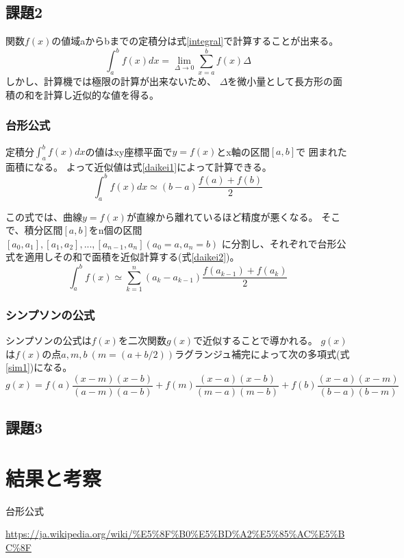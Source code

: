 \documentclass[dvipdfmx]{jsarticle}
\begin{document}
\subsection{課題2}

関数$f(x)$の値域aからbまでの定積分は式\ref{integral}で計算することが出来る。
\begin{equation}
  \int_a^b f(x) dx = \lim_{\Delta \to 0} \sum_{x=a}^{b} f(x) \Delta
  \label{integral}
\end{equation}
しかし、計算機では極限の計算が出来ないため、
$\Delta$を微小量として長方形の面積の和を計算し近似的な値を得る。

\subsubsection{台形公式}
定積分$\int_a^b f(x)dx$の値はxy座標平面で$y=f(x)$とx軸の区間$[a,b]$で
囲まれた面積になる。
よって近似値は式\ref{daikei1}によって計算できる。
\begin{equation}
  \int_a^b f(x)dx \simeq (b-a)\frac{f(a)+f(b)}{2}
  \label{daikei1}
\end{equation}

この式では、曲線$y=f(x)$が直線から離れているほど精度が悪くなる。
そこで、積分区間$[a,b]$をn個の区間$[a_0,a_1],[a_1,a_2],...,[a_{n-1},a_n] (a_0=a,a_n=b)$
に分割し、それぞれで台形公式を適用しその和で面積を近似計算する(式\ref{daikei2})。
\begin{equation}
  \int_a^b f(x) \simeq \sum_{k=1}^{n} (a_k-a_{k-1})\frac{f(a_{k-1})+f(a_k)}{2}
  \label{daikei2}
\end{equation}

\subsubsection{シンプソンの公式}
シンプソンの公式は$f(x)$を二次関数$g(x)$で近似することで導かれる。
$g(x)$は$f(x)$の点$a,m,b~(m=(a+b/2))$ラグランジュ補完によって次の多項式(式\ref{sim1})になる。
\begin{equation}
  g(x) = f(a)\frac{(x-m)(x-b)}{(a-m)(a-b)}+f(m)\frac{(x-a)(x-b)}{(m-a)(m-b)}+f(b)\frac{(x-a)(x-m)}{(b-a)(b-m)}
  \label{sim1}
\end{equation}



\subsection{課題3}

\section{結果と考察}

\begin{thebibliography}{10}
   台形公式

  \url{https://ja.wikipedia.org/wiki/%E5%8F%B0%E5%BD%A2%E5%85%AC%E5%BC%8F}
\end{thebibliography}
\end{document}
